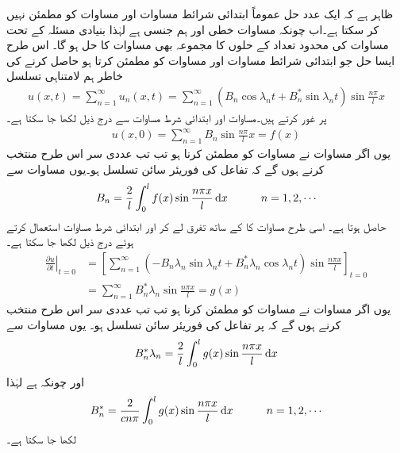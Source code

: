  \quad ظاہر ہے کہ ایک عدد حل  عموماً ابتدائی شرائط مساوات  اور مساوات  کو مطمئن نہیں کر سکتا ہے۔اب چونکہ مساوات  خطی اور ہم جنسی ہے لہٰذا بنیادی مسئلہ  کے تحت مساوات  کی محدود تعداد کے حلوں  کا مجموعہ بھی مساوات  کا حل ہو گا۔  اس طرح ایسا حل جو  ابتدائی شرائط مساوات  اور مساوات  کو مطمئن کرتا ہو حاصل کرنے کی خاطر ہم لامتناہی تسلسل
\begin{align}\label{مساوات_جزوی_مساوات_موج_ڈ}
u(x,t)=\sum_{n=1}^{\infty} u_n(x,t)=\sum_{n=1}^{\infty} (B_n\cos \lambda_n t+B^*_n\sin \lambda_n t)\sin \frac{n\pi}{l}x
\end{align}
پر غور کرتے ہیں۔مساوات  اور ابتدائی شرط مساوات  سے درج ذیل لکھا جا سکتا ہے۔
\begin{align}\label{مساوات_جزوی_مساوات_موج_ذ}
u(x,0)=\sum_{n=1}^{\infty} B_n\sin \frac{n\pi}{l}x=f(x)
\end{align} 
یوں اگر مساوات  نے مساوات  کو مطمئن کرنا ہو تب تب عددی سر   اس طرح منتخب کرنے ہوں گے کہ  تفاعل  کی فوریئر سائن تسلسل ہو۔یوں  مساوات  سے
\begin{align}\label{مساوات_جزوی_مساوات_موج_ر}
B_n=\frac{2}{l}\int_0^l f(x)\sin \frac{n\pi x}{l}\dif x\quad \quad \quad n=1,2,\cdots
\end{align}
حاصل ہوتا ہے۔
اسی طرح مساوات  کا  کے ساتھ تفرق لے کر اور ابتدائی شرط  مساوات  استعمال کرتے ہوئے درج ذیل لکھا جا سکتا ہے۔ 
\begin{align*}
\left. \frac{\partial u}{\partial t}\right|_{t=0}&=\left[\sum_{n=1}^{\infty} (-B_n\lambda_n\sin \lambda_nt+B^*_n\lambda_n\cos \lambda_nt)\sin\frac{n\pi x}{l}\right]_{t=0}\\
&=\sum_{n=1}^{\infty} B^*_n\lambda_n\sin\frac{n\pi x}{l} =g(x)
\end{align*}
یوں اگر مساوات  نے مساوات  کو مطمئن کرنا ہو تب تب عددی سر   اس طرح منتخب کرنے ہوں گے کہ  پر   تفاعل  کی فوریئر سائن تسلسل ہو۔ یوں مساوات  سے 
\begin{align*}
B^*_n\lambda_n=\frac{2}{l}\int_0^l g(x)\sin \frac{n\pi x}{l} \dif x
\end{align*}
اور چونکہ  ہے لہٰذا
\begin{align}\label{مساوات_جزوی_مساوات_موج_ڑ}
B^*_n=\frac{2}{cn\pi}\int_0^l g(x)\sin \frac{n\pi x}{l}\dif x\quad \quad \quad n=1,2,\cdots
\end{align}
لکھا جا سکتا ہے۔

